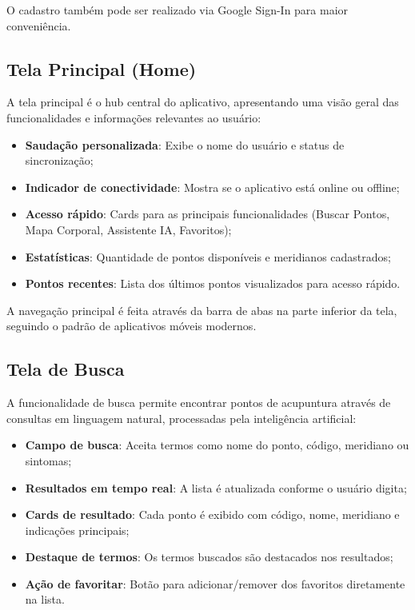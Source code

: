 O cadastro também pode ser realizado via Google Sign-In para maior conveniência.


\subsection{Tela Principal (Home)}

A tela principal é o hub central do aplicativo, apresentando uma visão geral das funcionalidades e informações relevantes ao usuário:

\begin{itemize}
    \item \textbf{Saudação personalizada}: Exibe o nome do usuário e status de sincronização;
    \item \textbf{Indicador de conectividade}: Mostra se o aplicativo está online ou offline;
    \item \textbf{Acesso rápido}: Cards para as principais funcionalidades (Buscar Pontos, Mapa Corporal, Assistente IA, Favoritos);
    \item \textbf{Estatísticas}: Quantidade de pontos disponíveis e meridianos cadastrados;
    \item \textbf{Pontos recentes}: Lista dos últimos pontos visualizados para acesso rápido.
\end{itemize}

A navegação principal é feita através da barra de abas na parte inferior da tela, seguindo o padrão de aplicativos móveis modernos.


\subsection{Tela de Busca}

A funcionalidade de busca permite encontrar pontos de acupuntura através de consultas em linguagem natural, processadas pela inteligência artificial:

\begin{itemize}
    \item \textbf{Campo de busca}: Aceita termos como nome do ponto, código, meridiano ou sintomas;
    \item \textbf{Resultados em tempo real}: A lista é atualizada conforme o usuário digita;
    \item \textbf{Cards de resultado}: Cada ponto é exibido com código, nome, meridiano e indicações principais;
    \item \textbf{Destaque de termos}: Os termos buscados são destacados nos resultados;
    \item \textbf{Ação de favoritar}: Botão para adicionar/remover dos favoritos diretamente na lista.
\end{itemize}

